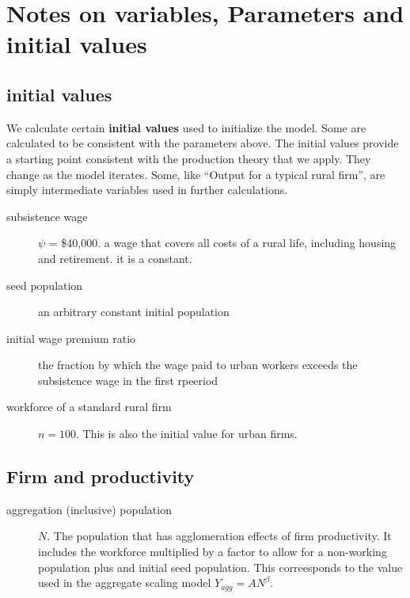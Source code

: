 \newpage


 \section{Notes on variables, Parameters and initial values} \label{section-notes-on-variables}
 
\subsection{initial values}
We calculate certain  \textbf{initial values} used to initialize the model. Some are calculated to be consistent with the parameters above. The initial values provide a starting point consistent with the production theory that we apply. They change as the model iterates.  Some, like ``Output for a typical rural firm'', are simply intermediate variables used in further calculations.%

\begin{description}

\item[subsistence wage] $\psi$ = \$40,000. %
a wage that covers all costs of a rural life, including housing and retirement. it is a constant.

\item[seed population] an arbitrary constant initial population 

\item[initial wage premium ratio] the fraction by which the wage paid to urban workers exceeds  the subsistence wage in the first rpeeriod 

\item[workforce of a standard rural firm] $n=100$. This is also the initial value for urban firms.
\end{description}


\subsection{Firm and productivity}

\begin{description}
\item[aggregation (inclusive) population  ]  $N$. The population that has agglomeration effects of firm productivity. It includes the workforce multiplied by a factor to allow for a non-working population plus and initial seed population. This correesponds to the value used in the aggregate scaling model $Y_{agg}= AN^\beta. $
\end{description}

